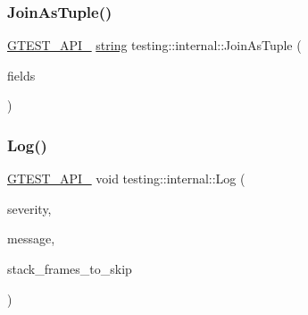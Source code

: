 \mbox{\label{namespacetesting_1_1internal_a61d60981533cb0875bad9025e0d98b74}} 
\subsubsection{\texorpdfstring{Join\+As\+Tuple()}{JoinAsTuple()}}
{\footnotesize\ttfamily \hyperlink{gtest-port_8h_aa73be6f0ba4a7456180a94904ce17790}{G\+T\+E\+S\+T\+\_\+\+A\+P\+I\+\_\+} \hyperlink{namespacetesting_1_1internal_a8e8ff5b11e64078831112677156cb111}{string} testing\+::internal\+::\+Join\+As\+Tuple (\begin{DoxyParamCaption}\item[{const \hyperlink{namespacetesting_1_1internal_a7706b17f05f4b49e351b052ae4e05073}{Strings} \&}]{fields }\end{DoxyParamCaption})}

\mbox{\label{namespacetesting_1_1internal_ac0bc151763a8187d74387c4b2ba685c9}} 
\subsubsection{\texorpdfstring{Log()}{Log()}}
{\footnotesize\ttfamily \hyperlink{gtest-port_8h_aa73be6f0ba4a7456180a94904ce17790}{G\+T\+E\+S\+T\+\_\+\+A\+P\+I\+\_\+} void testing\+::internal\+::\+Log (\begin{DoxyParamCaption}\item[{\hyperlink{namespacetesting_1_1internal_a203d1a8a2147a53d12bbdae40d443914}{Log\+Severity}}]{severity,  }\item[{const \hyperlink{namespacetesting_1_1internal_a8e8ff5b11e64078831112677156cb111}{string} \&}]{message,  }\item[{int}]{stack\+\_\+frames\+\_\+to\+\_\+skip }\end{DoxyParamCaption})}

\mbox{\label{namespacetesting_1_1internal_a69ffdba5ee36743e88d8f89b79e566ff}} 
